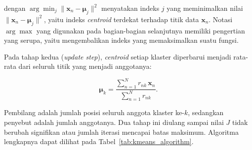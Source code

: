 \noindent dengan $\arg\min_j \|\mathbf{x}_n - \boldsymbol{\mu}_j\|^2$
menyatakan indeks $j$ yang meminimalkan nilai
$\|\mathbf{x}_n - \boldsymbol{\mu}_j\|^2$, yaitu indeks \textit{centroid}
terdekat terhadap titik data $\mathbf{x}_n$. Notasi $\arg\max$ yang
digunakan pada bagian-bagian selanjutnya memiliki pengertian yang serupa,
yaitu mengembalikan indeks yang memaksimalkan suatu fungsi.

Pada tahap kedua (\textit{update step}), \textit{centroid} setiap klaster
diperbarui menjadi rata-rata dari seluruh titik yang menjadi anggotanya:

\begin{equation}
    \boldsymbol{\mu}_k = \frac{\sum_{n=1}^{N} r_{nk}\,
    \mathbf{x}_n}{\sum_{n=1}^{N} r_{nk}}.
    \label{eq:centroid_update}
\end{equation}

Pembilang adalah jumlah posisi seluruh anggota klaster ke-$k$, sedangkan
penyebut adalah jumlah anggotanya. Dua tahap ini diulang sampai nilai $J$
tidak berubah signifikan atau jumlah iterasi mencapai batas maksimum.
Algoritma lengkapnya dapat dilihat pada Tabel~\ref{tab:kmeans_algorithm}.


